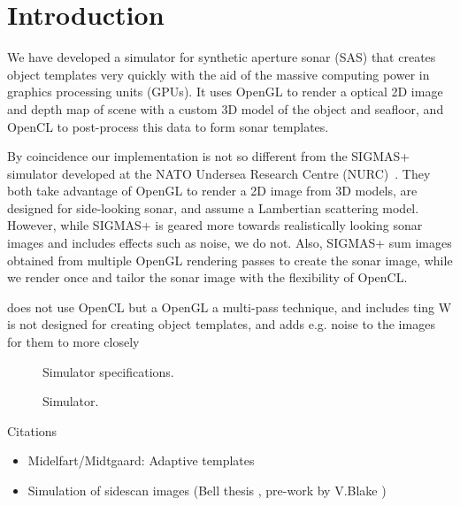 \documentclass[
   UAM                                          %
 , 12pt                                         %
 , bibtex                                       %
 , layout
]{common/mytemplate}
\begin{document}
\section{Introduction}




We have developed a simulator for synthetic aperture sonar (SAS) that creates object templates very quickly with the aid of the massive computing power in graphics processing units (GPUs). It uses OpenGL to render a optical 2D image and depth map of scene with a custom 3D model of the object and seafloor, and OpenCL to post-process this data to form sonar templates.  

By coincidence our implementation is not so different from the SIGMAS+ simulator developed at the NATO Undersea Research Centre (NURC)~\cite{Coiras2009a, Coiras2009b}. They both take advantage of OpenGL to render a 2D image from 3D models, are designed for side-looking sonar, and assume a Lambertian scattering model. However, while SIGMAS+ is geared more towards realistically looking sonar images and includes effects such as noise, we do not. Also, SIGMAS+ sum images obtained from multiple OpenGL rendering passes to create the sonar image, while we render once and tailor the sonar image with the flexibility of OpenCL. 

does not use OpenCL but a OpenGL a multi-pass technique, and includes ting  W
is not designed for creating object templates, and adds e.g. noise to the images for them to more closely  

\begin{figure}[t]\centering%
%
\caption{Simulator specifications.}\label{specs}%
\end{figure}

\begin{figure}[t]\centering%
%
\caption{Simulator.}\label{buildup}%
\end{figure}

Citations
\begin{itemize}
\item Midelfart/Midtgaard: Adaptive templates \cite{Midelfart2010}
\item Simulation of sidescan images (Bell thesis \cite{Bell1997}, pre-work by V.Blake \cite{Blake1993})
\end{itemize}
\end{document}
